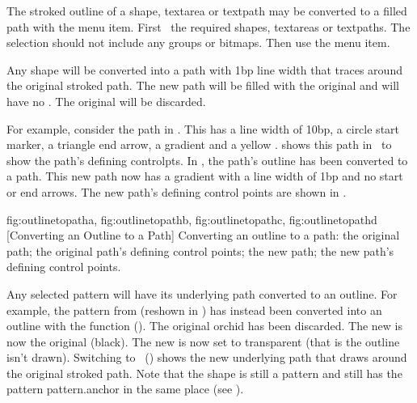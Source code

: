 
The stroked outline of a \gls{shape}, \gls{textarea} or
\gls{textpath} may be converted to a filled path
with the  menu item.
First \select\ the required \glspl{shape}, \glspl{textarea} or
\glspl{textpath}. The selection should not include any \glspl{group}
or \glspl{bitmap}. Then use the  menu item.

Any \gls{shape} will be converted into a \gls{path} with 1\gls{bp}
line width that traces around the original stroked path. The new
path will be filled with the original  and
will have no . The original
 will be discarded.

For example, consider the path in .
This has a line width of 10\gls{bp}, a circle start marker,
a triangle end arrow, a gradient  and a yellow
.  shows this
path in \editpathmode\ to show the path's defining \glspl{controlpt}. In
, the path's outline
has been converted to a path. This new path now has
a gradient  with a line width of 1\gls{bp} and
no start or end arrows. The new path's defining
control points are shown in .

{
  {fig:outlinetopatha}{}{},
  {fig:outlinetopathb}{}{},
  {fig:outlinetopathc}{}{},
  {fig:outlinetopathd}{}{}
}
[Converting an Outline to a Path]
{Converting an outline to a path:
 the original path;
 the original path's defining control points;
 the new path;
 the new path's defining control points.}

Any selected \gls{pattern} will have its underlying path
converted to an outline. For example, the \gls{pattern}
from  (reshown in
) has instead been
converted into an outline with the  function
(). The original orchid
 has been discarded. The new
 is now the original 
(black). The new  is now set to \gls{transparent}
(that is the outline isn't drawn). Switching to \editpathmode\
() shows the new underlying
path that draws around the original stroked path. Note that the
\gls{shape} is still a \gls{pattern} and still has the pattern
\gls{pattern.anchor} in the same place (see ).

